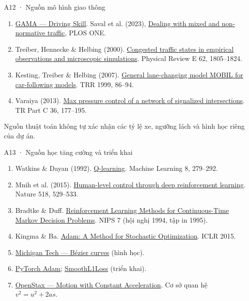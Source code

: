 \documentclass[aspectratio=169,10pt]{beamer}
\begin{document}
\begin{frame}{A12 · Nguồn mô hình giao thông}
\relax

\small
\begin{enumerate}
\item[\textbf{[1]}] \href{https://gama-platform.org/wiki/UsingDrivingSkill}{GAMA — Driving Skill}. Saval et al. (2023), \href{https://doi.org/10.1371/journal.pone.0281658}{Dealing with mixed and non-normative traffic}, PLOS ONE.
\item[\textbf{[2]}] Treiber, Hennecke \& Helbing (2000). \href{https://doi.org/10.1103/PhysRevE.62.1805}{Congested traffic states in empirical observations and microscopic simulations}. Physical Review E 62, 1805–1824.
\item[\textbf{[3]}] Kesting, Treiber \& Helbing (2007). \href{https://doi.org/10.3141/1999-10}{General lane-changing model MOBIL for car-following models}. TRR 1999, 86–94.
\item[\textbf{[4]}] Varaiya (2013). \href{https://doi.org/10.1016/j.trc.2013.08.014}{Max pressure control of a network of signalized intersections}. TR Part C 36, 177–195.
\end{enumerate}
\vspace{.25cm}Nguồn thuật toán không tự xác nhận các tỷ lệ xe, ngưỡng lách và hình học riêng của dự án.

\end{frame}
\begin{frame}{A13 · Nguồn học tăng cường và triển khai}
\relax

\small
\begin{enumerate}
\item[\textbf{[5]}] Watkins \& Dayan (1992). \href{https://doi.org/10.1007/BF00992698}{Q-learning}. Machine Learning 8, 279–292.
\item[\textbf{[6]}] Mnih et al. (2015). \href{https://doi.org/10.1038/nature14236}{Human-level control through deep reinforcement learning}. Nature 518, 529–533.
\item[\textbf{[7]}] Bradtke \& Duff. \href{https://proceedings.neurips.cc/paper_files/paper/1994/hash/07871915a8107172b3b5dc15a6574ad3-Abstract.html}{Reinforcement Learning Methods for Continuous-Time Markov Decision Problems}. NIPS 7 (hội nghị 1994, tập in 1995).
\item[\textbf{[8]}] Kingma \& Ba. \href{https://arxiv.org/abs/1412.6980}{Adam: A Method for Stochastic Optimization}. ICLR 2015.
\item[\textbf{[9]}] \href{https://pages.mtu.edu/~shene/COURSES/cs3621/NOTES/spline/Bezier/bezier-construct.html}{Michigan Tech — Bézier curves} (hình học).
\item[\textbf{[10]}] \href{https://docs.pytorch.org/docs/stable/generated/torch.optim.Adam.html}{PyTorch Adam}; \href{https://docs.pytorch.org/docs/stable/generated/torch.nn.SmoothL1Loss.html}{SmoothL1Loss} (triển khai).
\item[\textbf{[11]}] \href{https://openstax.org/books/university-physics-volume-1/pages/3-4-motion-with-constant-acceleration}{OpenStax — Motion with Constant Acceleration}. Cơ sở quan hệ $v^2=u^2+2as$.
\end{enumerate}

\end{frame}
\end{document}
